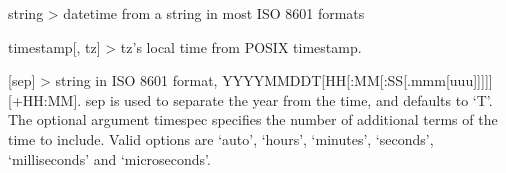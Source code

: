 \documentclass[letterpaper,10pt,english]{sphinxmanual}
\begin{document}
\begin{fulllineitems}
\begin{fulllineitems}
\label{\detokenize{modules/src.pig_sorting_api.main:src.pig_sorting_api.main.datetime.fromisoformat}}
\pysigstartsignatures
\pysiglinewithargsret
{}
{}
{}
\pysigstopsignatures
\sphinxAtStartPar
string \sphinxhyphen{}\textgreater{} datetime from a string in most ISO 8601 formats

\end{fulllineitems}


\begin{fulllineitems}
\label{\detokenize{modules/src.pig_sorting_api.main:src.pig_sorting_api.main.datetime.fromtimestamp}}
\pysigstartsignatures
\pysiglinewithargsret
{}
{}
{}
\pysigstopsignatures
\sphinxAtStartPar
timestamp{[}, tz{]} \sphinxhyphen{}\textgreater{} tz’s local time from POSIX timestamp.

\end{fulllineitems}


\begin{fulllineitems}
\label{\detokenize{modules/src.pig_sorting_api.main:src.pig_sorting_api.main.datetime.hour}}
\pysigstartsignatures
\pysigline
{}
\pysigstopsignatures
\end{fulllineitems}


\begin{fulllineitems}
\label{\detokenize{modules/src.pig_sorting_api.main:src.pig_sorting_api.main.datetime.isoformat}}
\pysigstartsignatures
\pysiglinewithargsret
{}
{}
{}
\pysigstopsignatures
\sphinxAtStartPar
{[}sep{]} \sphinxhyphen{}\textgreater{} string in ISO 8601 format, YYYY\sphinxhyphen{}MM\sphinxhyphen{}DDT{[}HH{[}:MM{[}:SS{[}.mmm{[}uuu{]}{]}{]}{]}{]}{[}+HH:MM{]}.
sep is used to separate the year from the time, and defaults to ‘T’.
The optional argument timespec specifies the number of additional terms
of the time to include. Valid options are ‘auto’, ‘hours’, ‘minutes’,
‘seconds’, ‘milliseconds’ and ‘microseconds’.


\end{fulllineitems}
\end{fulllineitems}
\end{document}
